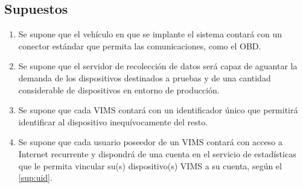 \subsection*{Supuestos}
\begin{enumerate}[label=\textbf{\texttt{SUP-\arabic*}}]
  \item\label{sup:connectivity} Se supone que el vehículo en que se implante el sistema contará con un
        conector estándar que permita las comunicaciones, como el \ac{OBD}.
  \item\label{sup:server} Se supone que el servidor de recolección de datos será
        capaz de aguantar la demanda de los dispositivos destinados a pruebas y de
        una cantidad considerable de dispositivos en entorno de producción.
  \item\label{sup:uid} Se supone que cada \ac{VIMS} contará con un identificador
        único que permitirá identificar al dispositivo inequívocamente del resto.
  \item\label{sup:users} Se supone que cada usuario poseedor de un \ac{VIMS} contará
        con acceso a Internet recurrente y dispondrá de una cuenta en el servicio de
        estadísticas que le permita vincular su(s) dispositivo(s) \ac{VIMS} a su
        cuenta, según el \ref{sup:uid}.
\end{enumerate}